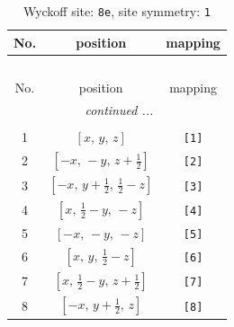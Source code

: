 \documentclass[fleqn,8pt]{jsarticle}
\begin{document}
\renewcommand{\arraystretch}{1.2}
\begin{longtable}{ccc}
\caption{Wyckoff site: {\tt 8e}, site symmetry: {\tt 1}}
 \\
 \hline \hline
No. & position & mapping \\ \hline \endfirsthead

\multicolumn{2}{l}{\tablename\ \thetable{}} \\
 \hline \hline
No. & position & mapping \\ \hline \endhead

 \hline \hline
\multicolumn{2}{r}{\footnotesize\it continued ...} \\ \endfoot

 \hline \hline
\multicolumn{2}{r}{} \\ \endlastfoot

1 & $\left[ x,\, y,\, z \right]$ & {\tt [1]} \\ \hline
2 & $\left[ - x,\, - y,\, z + \frac{1}{2} \right]$ & {\tt [2]} \\ \hline
3 & $\left[ - x,\, y + \frac{1}{2},\, \frac{1}{2} - z \right]$ & {\tt [3]} \\ \hline
4 & $\left[ x,\, \frac{1}{2} - y,\, - z \right]$ & {\tt [4]} \\ \hline
5 & $\left[ - x,\, - y,\, - z \right]$ & {\tt [5]} \\ \hline
6 & $\left[ x,\, y,\, \frac{1}{2} - z \right]$ & {\tt [6]} \\ \hline
7 & $\left[ x,\, \frac{1}{2} - y,\, z + \frac{1}{2} \right]$ & {\tt [7]} \\ \hline
8 & $\left[ - x,\, y + \frac{1}{2},\, z \right]$ & {\tt [8]} \\
\end{longtable}
\end{document}
